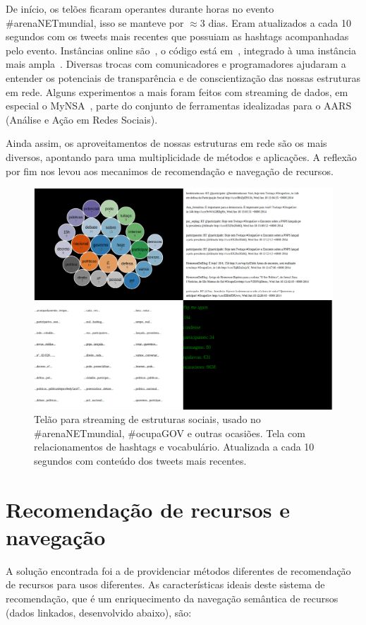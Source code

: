 \documentclass[a4paper, 11pt]{article} %
\begin{document}
De início, os telões ficaram operantes durante horas no evento \#arenaNETmundial, isso se manteve por $\approx 3$ dias. Eram atualizados a cada 10 segundos com os tweets mais recentes que possuiam as hashtags acompanhadas pelo evento. Instâncias online são~\cite{ocupagov,mmissa,mmissa2}, o código está em~\cite{codTelao}, integrado à uma instância mais ampla~\cite{mmissa2}. Diversas trocas com comunicadores e programadores ajudaram a entender os potenciais de transparência e de conscientização das nossas estruturas em rede. Alguns experimentos a mais foram feitos com streaming de dados, em especial o MyNSA~\cite{mynsa}, parte do conjunto de ferramentas idealizadas para o AARS (Análise e Ação em Redes Sociais).

Ainda assim, os aproveitamentos de nossas estruturas em rede são os mais diversos, apontando para uma multiplicidade de métodos e aplicações. A reflexão por fim nos levou aos mecanimos de recomendação e navegação de recursos.
\begin{figure}[H]
  \centering
    \includegraphics[width=.7\textwidth]{telao2.png}
  \caption{\small Telão para streaming de estruturas sociais, usado no \#arenaNETmundial, \#ocupaGOV e outras ocasiões. Tela com relacionamentos de hashtags e vocabulário. Atualizada a cada 10 segundos com conteúdo dos tweets mais recentes.}\label{fig:telao2}
\end{figure}


\section*{Recomendação de recursos e navegação}
A solução encontrada foi a de providenciar métodos diferentes de recomendação de recursos para usos diferentes. As características ideais deste sistema de recomendação, que é um enriquecimento da navegação semântica de recursos (dados linkados, desenvolvido abaixo), são:
\end{document}
